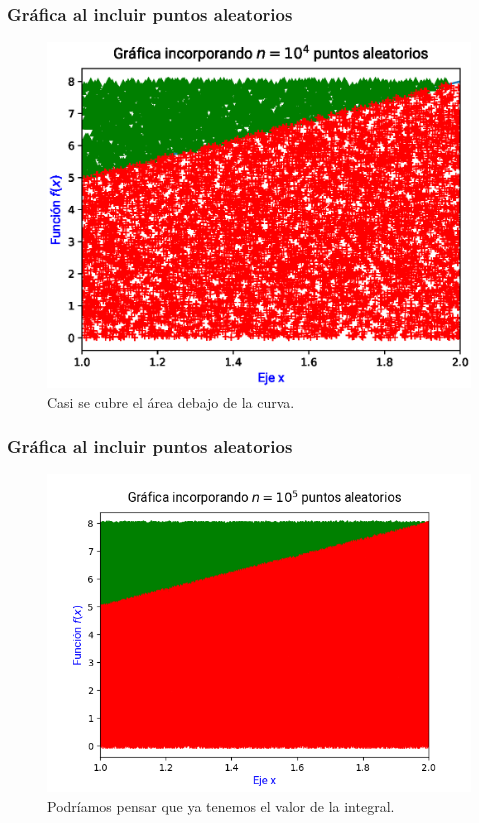 \begin{frame}
\frametitle{Gráfica al incluir puntos aleatorios}
\begin{figure}[h!]
    \centering
    \includegraphics[scale=0.55]{Imagenes/area_puntos_04.eps}
    \caption{Casi se cubre el área debajo de la curva.}
\end{figure}
\end{frame}
\begin{frame}
\frametitle{Gráfica al incluir puntos aleatorios}
\begin{figure}[h!]
    \centering
    \includegraphics[scale=0.55]{Imagenes/area_puntos_05.png}
    \caption{Podríamos pensar que ya tenemos el valor de la integral.}
\end{figure}
\end{frame}
